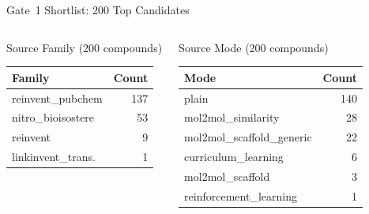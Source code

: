 \documentclass[aspectratio=169]{beamer}
\begin{document}
\begin{frame}{Gate~1 Shortlist: 200 Top Candidates}
\begin{columns}
    \begin{block}{Source Family (200 compounds)}
      \small
      \begin{tabular}{lr}
        \toprule
        \textbf{Family} & \textbf{Count} \\
        \midrule
        reinvent\_pubchem         & 137 \\
        nitro\_bioisostere        & 53 \\
        reinvent                  & 9 \\
        linkinvent\_trans.        & 1 \\
        \bottomrule
      \end{tabular}
    \end{block}
    \vspace{0.3em}
    \begin{block}{Source Mode (200 compounds)}
      \small
      \begin{tabular}{lr}
        \toprule
        \textbf{Mode} & \textbf{Count} \\
        \midrule
        plain                & 140 \\
        mol2mol\_similarity  & 28 \\
        mol2mol\_scaffold\_generic & 22 \\
        curriculum\_learning & 6 \\
        mol2mol\_scaffold    & 3 \\
        reinforcement\_learning & 1 \\
        \bottomrule
      \end{tabular}
    \end{block}
  \end{columns}
\end{frame}
\end{document}
